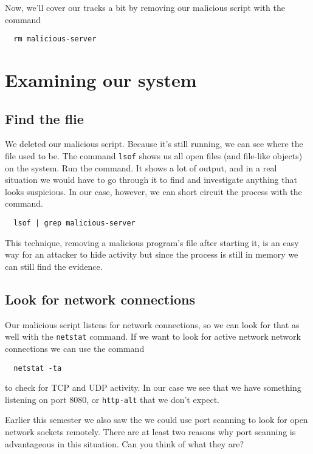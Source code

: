 \documentclass{article}
\begin{document}
Now, we'll cover our tracks a bit by removing our malicious script with the command

\begin{verbatim}
  rm malicious-server
\end{verbatim}

\section{Examining our system}
\subsection{Find the flie}
We deleted our malicious script.  Because it's still running, we can see where the file used to be.  The command \texttt{lsof} shows us all open files (and file-like objects) on the system.  Run the command. It shows a lot of output, and in a real situation we would have to go through it to find and investigate anything that looks suspicious. In our case, however, we can short circuit the process with the command.

\begin{verbatim}
  lsof | grep malicious-server
\end{verbatim}

This technique, removing a malicious program's file after starting it, is an easy way for an attacker to hide activity but since the process is still in memory we can still find the evidence.

\subsection{Look for network connections}
Our malicious script listens for network connections, so we can look for that as well with the \texttt{netstat} command. If we want to look for active network network connections we can use the command

\begin{verbatim}
  netstat -ta
\end{verbatim}

to check for TCP and UDP activity.  In our case we see that we have something listening on port 8080, or \texttt{http-alt} that we don't expect.

Earlier this semester we also saw the we could use port scanning to look for open network sockets remotely.  There are at least two reasons why port scanning is advantageous in this situation.  Can you think of what they are?
\end{document}
